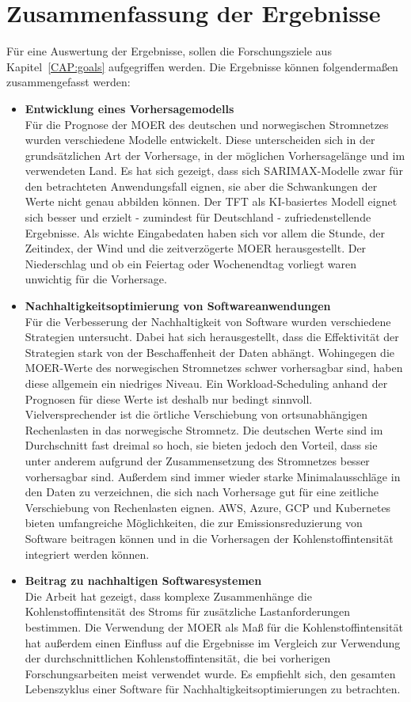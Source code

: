 \chapter{Zusammenfassung der Ergebnisse}\label{CAP:results}
Für eine Auswertung der Ergebnisse, sollen die Forschungsziele aus Kapitel~\ref{CAP:goals} aufgegriffen werden.
Die Ergebnisse können folgendermaßen zusammengefasst werden:
\begin{itemize}
 \item \textbf{Entwicklung eines Vorhersagemodells} \\
 Für die Prognose der \ac{MOER} des deutschen und norwegischen Stromnetzes wurden verschiedene Modelle entwickelt.
 Diese unterscheiden sich in der grundsätzlichen Art der Vorhersage, in der möglichen Vorhersagelänge und im verwendeten Land.
 Es hat sich gezeigt, dass sich \ac{SARIMAX}-Modelle zwar für den betrachteten Anwendungsfall eignen, sie aber die Schwankungen der Werte nicht genau abbilden können.
 Der \ac{TFT} als \ac{KI}-basiertes Modell eignet sich besser und erzielt - zumindest für Deutschland - zufriedenstellende Ergebnisse.
 Als wichte Eingabedaten haben sich vor allem die Stunde, der Zeitindex, der Wind und die zeitverzögerte \ac{MOER} herausgestellt.
 Der Niederschlag und ob ein Feiertag oder Wochenendtag vorliegt waren unwichtig für die Vorhersage.
 \item \textbf{Nachhaltigkeitsoptimierung von Softwareanwendungen} \\
 Für die Verbesserung der Nachhaltigkeit von Software wurden verschiedene Strategien untersucht.
 Dabei hat sich herausgestellt, dass die Effektivität der Strategien stark von der Beschaffenheit der Daten abhängt.
 Wohingegen die \ac{MOER}-Werte des norwegischen Stromnetzes schwer vorhersagbar sind, haben diese allgemein ein niedriges Niveau.
 Ein Workload-Scheduling anhand der Prognosen für diese Werte ist deshalb nur bedingt sinnvoll.
 Vielversprechender ist die örtliche Verschiebung von ortsunabhängigen Rechenlasten in das norwegische Stromnetz.
 Die deutschen Werte sind im Durchschnitt fast dreimal so hoch, sie bieten jedoch den Vorteil, dass sie unter anderem aufgrund der Zusammensetzung des Stromnetzes besser vorhersagbar sind.
 Außerdem sind immer wieder starke Minimalausschläge in den Daten zu verzeichnen, die sich nach Vorhersage gut für eine zeitliche Verschiebung von Rechenlasten eignen.
 \ac{AWS}, Azure, \ac{GCP} und Kubernetes bieten umfangreiche Möglichkeiten, die zur Emissionsreduzierung von Software beitragen können und in die Vorhersagen der Kohlenstoffintensität integriert werden können.
 \item \textbf{Beitrag zu nachhaltigen Softwaresystemen} \\
 Die Arbeit hat gezeigt, dass komplexe Zusammenhänge die Kohlenstoffintensität des Stroms für zusätzliche Lastanforderungen bestimmen.
 Die Verwendung der \ac{MOER} als Maß für die Kohlenstoffintensität hat außerdem einen Einfluss auf die Ergebnisse im Vergleich zur Verwendung der durchschnittlichen Kohlenstoffintensität, die bei vorherigen Forschungsarbeiten meist verwendet wurde.
 Es empfiehlt sich, den gesamten Lebenszyklus einer Software für Nachhaltigkeitsoptimierungen zu betrachten.
\end{itemize}
